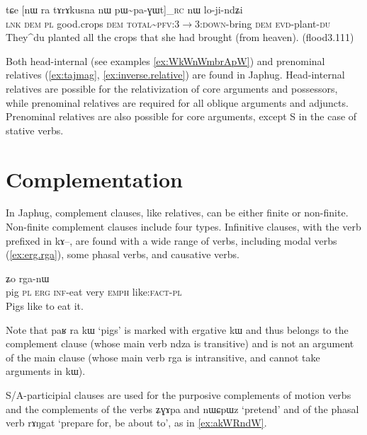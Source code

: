\documentclass[oldfontcommands,oneside,a4paper,11pt]{article}
\newcommand{\ipa}[1]{{\phon #1}} %
\newcommand{\topic}{\textsc{dem}}
\begin{document}
  \begin{exe}
\ex \label{ex:pWpaGWt}
\gll
\ipa{tɕe}  	[\ipa{nɯ} \ipa{ra}  	\ipa{tɤrɤkusna} 	\ipa{nɯ}  	\ipa{pɯ\textasciitilde{}pa-ɣɯt}]_{\textsc{rc}}  	\ipa{nɯ}  	\ipa{lo-ji-ndʑi}  \\
\textsc{lnk} \textsc{dem} \textsc{pl} good.crops \topic{} \textsc{total\textasciitilde{}pfv:3$\rightarrow$3:down}-bring \topic{} \textsc{evd}-plant-\textsc{du} \\
\glt They^{du} planted all the crops that she had brought (from heaven). (flood3.111)
\end{exe}

Both head-internal (see examples \ref{ex:WkWnWmbrApW}) and prenominal relatives (\ref{ex:tajmag}, \ref{ex:inverse.relative}) are found in Japhug. Head-internal relatives are possible for the relativization of core arguments and possessors, while prenominal relatives are required for all oblique arguments and adjuncts. Prenominal relatives are also possible for core arguments, except S in the case of stative verbs.

\section{Complementation}
In Japhug, complement clauses, like relatives, can be either finite or non-finite. Non-finite complement clauses include four types. Infinitive clauses, with the verb prefixed in \ipa{kɤ--}, are found with a wide range of verbs, including modal verbs (\ref{ex:erg.rga}), some phasal verbs, and causative verbs. 


 \begin{exe}
\ex \label{ex:erg.rga}
\gll
[\ipa{paʁ}  	\ipa{ra}  	\ipa{kɯ}  	\ipa{kɤ-ndza}]  	\ipa{wuma}  	\ipa{ʑo}  	\ipa{rga-nɯ}  \\
pig \textsc{pl} \textsc{erg} \textsc{inf}-eat very \textsc{emph}  like:\textsc{fact}-\textsc{pl} \\
 \glt Pigs like to eat it.
\end{exe}

Note that \ipa{paʁ} \ipa{ra} \ipa{kɯ} `pigs' is marked with ergative \ipa{kɯ} and thus belongs to the complement clause (whose main verb \ipa{ndza} is transitive) and is not an argument of the main clause (whose main verb \ipa{rga} is intransitive, and cannot take arguments in \ipa{kɯ}).


S/A-participial clauses are used for the purposive complements of motion verbs and the complements of the verbs \ipa{ʑɣɤpa} and \ipa{nɯɕpɯz} `pretend' and of the phasal verb \ipa{rɤŋgat} `prepare for, be about to', as in \ref{ex:akWRndW}.
\end{document}
